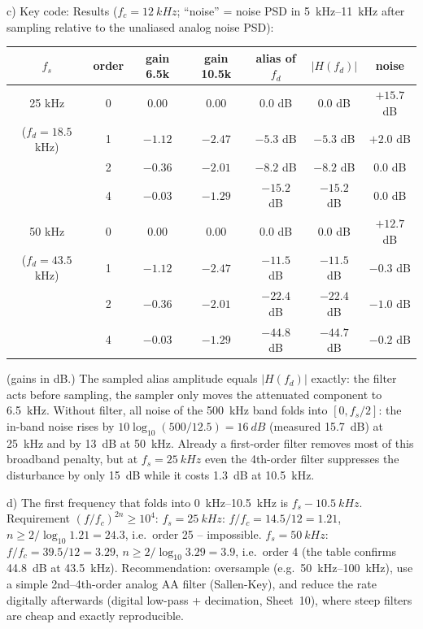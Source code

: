\begin{solution}
c) Key code:
Results ($f_c=\SI{12}{kHz}$; ``noise'' = noise PSD in \SIrange{5}{11}{kHz}
after sampling relative to the unaliased analog noise PSD):
\begin{center}\small
\begin{tabular}{@{}cc|cc|cc|c@{}}\toprule
$f_s$ & order & gain 6.5k & gain 10.5k & alias of $f_d$ & $|H(f_d)|$ & noise\\\midrule
25 kHz & 0 & 0.00 & 0.00 & 0.0 dB & 0.0 dB & $+15.7$ dB\\
($f_d=18.5$ kHz) & 1 & $-1.12$ & $-2.47$ & $-5.3$ dB & $-5.3$ dB & $+2.0$ dB\\
 & 2 & $-0.36$ & $-2.01$ & $-8.2$ dB & $-8.2$ dB & $0.0$ dB\\
 & 4 & $-0.03$ & $-1.29$ & $-15.2$ dB & $-15.2$ dB & $0.0$ dB\\\midrule
50 kHz & 0 & 0.00 & 0.00 & 0.0 dB & 0.0 dB & $+12.7$ dB\\
($f_d=43.5$ kHz) & 1 & $-1.12$ & $-2.47$ & $-11.5$ dB & $-11.5$ dB & $-0.3$ dB\\
 & 2 & $-0.36$ & $-2.01$ & $-22.4$ dB & $-22.4$ dB & $-1.0$ dB\\
 & 4 & $-0.03$ & $-1.29$ & $-44.8$ dB & $-44.7$ dB & $-0.2$ dB\\\bottomrule
\end{tabular}
\end{center}
(gains in dB.) The sampled alias amplitude equals $|H(f_d)|$ exactly: the
filter acts before sampling, the sampler only moves the attenuated component
to \SI{6.5}{kHz}. Without filter, all noise of the \SI{500}{kHz} band folds
into $[0,f_s/2]$: the in-band noise rises by $10\log_{10}(500/12.5)=\SI{16}{dB}$
(measured \SI{15.7}{dB}) at \SI{25}{kHz} and by \SI{13}{dB} at \SI{50}{kHz}.
Already a first-order filter removes most of this broadband penalty, but at
$f_s=\SI{25}{kHz}$ even the 4th-order filter suppresses the disturbance by only
\SI{15}{dB} while it costs \SI{1.3}{dB} at \SI{10.5}{kHz}.

d) The first frequency that folds into \SIrange{0}{10.5}{kHz} is
$f_s-\SI{10.5}{kHz}$. Requirement $(f/f_c)^{2n}\ge10^4$:
$f_s=\SI{25}{kHz}$: $f/f_c=14.5/12=1.21$, $n\ge 2/\log_{10}1.21=24.3$, i.e.\
order 25 -- impossible. $f_s=\SI{50}{kHz}$: $f/f_c=39.5/12=3.29$,
$n\ge2/\log_{10}3.29=3.9$, i.e.\ order 4 (the table confirms
\SI{44.8}{dB} at \SI{43.5}{kHz}). Recommendation: oversample (e.g.\
\SIrange{50}{100}{kHz}), use a simple 2nd--4th-order analog AA filter
(Sallen-Key), and reduce the rate digitally afterwards (digital low-pass +
decimation, Sheet~10), where steep filters are cheap and exactly
reproducible.
\end{solution}

